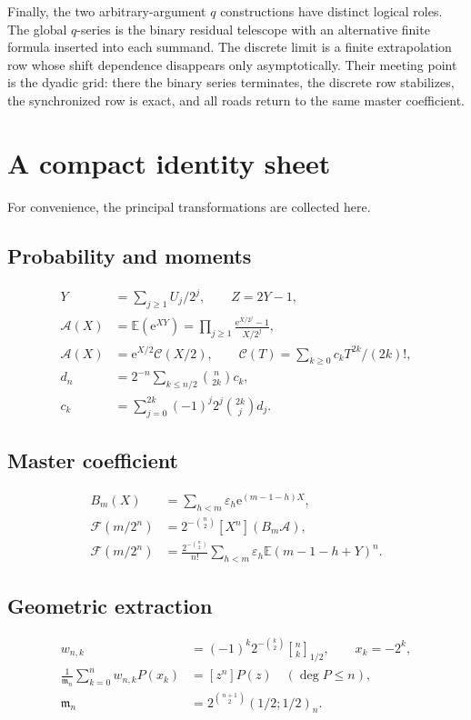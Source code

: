 \documentclass[11pt,oneside]{article}
\theoremstyle{definition}
\theoremstyle{remark}
\newcommand{\e}{\mathrm e}
\newcommand{\E}{\mathbb E}
\newcommand{\qbinom}[3]{\genfrac{[}{]}{0pt}{}{#1}{#2}_{#3}}
\newcommand{\tm}{\varepsilon}
\begin{document}
Finally, the two arbitrary-argument $q$ constructions have distinct logical roles.  The global
$q$-series is the binary residual telescope with an alternative finite formula inserted into
each summand.  The discrete limit is a finite extrapolation row whose shift dependence
disappears only asymptotically.  Their meeting point is the dyadic grid: there the binary
series terminates, the discrete row stabilizes, the synchronized row is exact, and all roads
return to the same master coefficient.

\appendix

\section{A compact identity sheet}
\label{app:identity-sheet}

For convenience, the principal transformations are collected here.

\subsection*{Probability and moments}
\begin{align*}
 Y&=\sum_{j\ge1}U_j/2^j,\qquad Z=2Y-1,\\
 \mathscr A(X)&=\E(\e^{XY})=\prod_{j\ge1}\frac{\e^{X/2^j}-1}{X/2^j},\\
 \mathscr A(X)&=\e^{X/2}\mathscr C(X/2),\qquad
 \mathscr C(T)=\sum_{k\ge0}c_kT^{2k}/(2k)!,\\
 d_n&=2^{-n}\sum_{k\le n/2}\binom n{2k}c_k,\\
 c_k&=\sum_{j=0}^{2k}(-1)^j2^j\binom{2k}{j}d_j.
\end{align*}

\subsection*{Master coefficient}
\begin{align*}
 B_m(X)&=\sum_{h<m}\tm_h\e^{(m-1-h)X},\\
 \mathcal F(m/2^n)&=2^{-\binom n2}[X^n](B_m\mathscr A),\\
 \mathcal F(m/2^n)&=\frac{2^{-\binom n2}}{n!}
   \sum_{h<m}\tm_h\E(m-1-h+Y)^n.
\end{align*}

\subsection*{Geometric extraction}
\begin{align*}
 w_{n,k}&=(-1)^k2^{-\binom k2}\qbinom nk{1/2},
 \qquad x_k=-2^k,\\
 \frac1{\mathfrak m_n}\sum_{k=0}^{n}w_{n,k}P(x_k)&=[z^n]P(z)
 \quad(\deg P\le n),\\
 \mathfrak m_n&=2^{\binom{n+1}{2}}(1/2;1/2)_n.
\end{align*}
\end{document}
